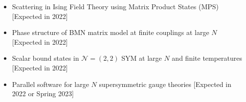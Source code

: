 \renewcommand{\arraystretch}{1.1}

	\begin{itemize} 
	 \item Scattering in Ising Field Theory using Matrix Product States (MPS) [Expected in 2022] 
	 \item Phase structure of BMN matrix model at finite couplings at large $N$ [Expected in 2022] 
	 \item Scalar bound states in $\mathcal{N}=(2,2)$ SYM at large $N$ and finite temperatures [Expected in 2022] 
	 \item Parallel software for large $N$ supersymmetric gauge theories [Expected in 2022 or Spring 2023] 
	 \end{itemize}
